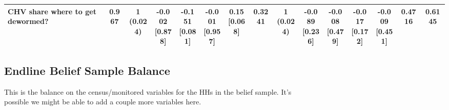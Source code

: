 \documentclass[
]{article}
\begin{document}
\begin{table}[htbp]
{\begin{tabular}[t]{lcccccccccccccc}
\hspace{1em}CHV share where to get dewormed? & 0.967 & \makecell[c]{1\\(0.024)} & \makecell[c]{-0.002\\{[0.878]}} & \makecell[c]{-0.151\\{[0.081]}} & \makecell[c]{-0.001\\{[0.957]}} & \makecell[c]{0.15\\{[0.068]}} & 0.3241 & \makecell[c]{1\\(0.024)} & \makecell[c]{-0.089\\{[0.236]}} & \makecell[c]{-0.008\\{[0.479]}} & \makecell[c]{-0.017\\{[0.172]}} & \makecell[c]{-0.009\\{[0.451]}} & 0.4716 & 0.6145\\
\bottomrule
\end{tabular}}

\end{table}

\FloatBarrier

\subsection{Endline Belief Sample
Balance}\label{endline-belief-sample-balance}

This is the balance on the census/monitored variables for the HHs in the
belief sample. It's\\
possible we might be able to add a couple more variables here.
\end{document}
